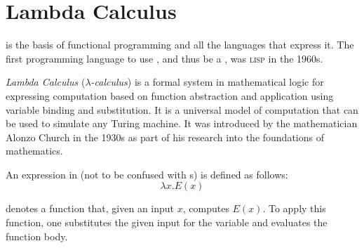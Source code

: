 \section{Lambda Calculus}\label{sec:Lambda_Calculus}
 is the basis of functional programming and all the languages that express it.
The first programming language to use , and thus be a , was \textsc{lisp} in the 1960s.

\begin{definition}\label{def:Lambda_Calculus}
  \emph{Lambda Calculus} (\emph{$\lambda$-calculus}) is a formal system in mathematical logic for expressing computation based on function abstraction and application using variable binding and substitution.
  It is a universal model of computation that can be used to simulate any Turing machine.
  It was introduced by the mathematician Alonzo Church in the 1930s as part of his research into the foundations of mathematics.
\end{definition}

An expression in  (not to be confused with s) is defined as follows:
\begin{equation}\label{eq:Basic_Lambda_Function}
  \lambda x. E(x)
\end{equation}

 denotes a function that, given an input $x$, computes $E(x)$.
To apply this function, one substitutes the given input for the variable and evaluates the function body.

